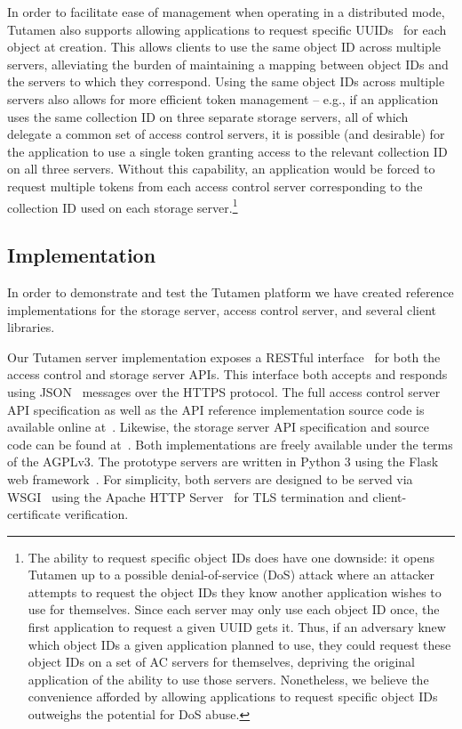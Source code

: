 In order to facilitate ease of management when operating in a
distributed mode, Tutamen also supports allowing applications to
request specific UUIDs~\cite{leach2005} for each object at creation.
This allows clients to use the same object ID across multiple servers,
alleviating the burden of maintaining a mapping between object IDs and
the servers to which they correspond. Using the same object IDs across
multiple servers also allows for more efficient token management --
e.g., if an application uses the same collection ID on three separate
storage servers, all of which delegate a common set of access control
servers, it is possible (and desirable) for the application to use a
single token granting access to the relevant collection ID on all
three servers. Without this capability, an application would be forced
to request multiple tokens from each access control server
corresponding to the collection ID used on each storage
server.\footnote{The ability to request specific object IDs does have
  one downside: it opens Tutamen up to a possible denial-of-service
  (DoS) attack where an attacker attempts to request the object IDs
  they know another application wishes to use for themselves. Since
  each server may only use each object ID once, the first application
  to request a given UUID gets it. Thus, if an adversary knew which
  object IDs a given application planned to use, they could request
  these object IDs on a set of AC servers for themselves, depriving
  the original application of the ability to use those
  servers. Nonetheless, we believe the convenience afforded by
  allowing applications to request specific object IDs outweighs the
  potential for DoS abuse.}

\subsection{Implementation}

In order to demonstrate and test the Tutamen platform we have created
reference implementations for the storage server, access control
server, and several client libraries.

Our Tutamen server implementation exposes a RESTful
interface~\cite{fielding2000} for both the access control and storage
server APIs. This interface both accepts and responds using
JSON~\cite{json} messages over the HTTPS protocol. The full access
control server API specification as well as the API reference
implementation source code is available online
at~\cite{src-tutamen-apiaccesscontrol}. Likewise, the storage server
API specification and source code can be found
at~\cite{src-tutamen-apistorage}. Both implementations are freely
available under the terms of the AGPLv3. The prototype servers are
written in Python 3 using the Flask web
framework~\cite{python-flask}. For simplicity, both servers are
designed to be served via WSGI~\cite{pep3333} using the Apache HTTP
Server~\cite{apache} for TLS termination and client-certificate
verification.

